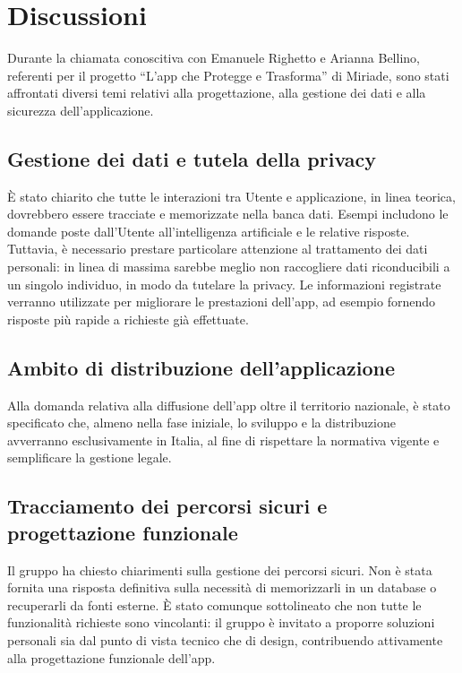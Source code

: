 \documentclass[a4paper,12pt]{article}
\begin{document}
\section{Discussioni}
Durante la chiamata conoscitiva con Emanuele Righetto e Arianna Bellino, referenti per il progetto “L’app che Protegge e Trasforma” di Miriade, sono stati affrontati diversi temi relativi alla progettazione, alla gestione dei dati e alla sicurezza dell’applicazione.

\subsection{Gestione dei dati e tutela della privacy}
È stato chiarito che tutte le interazioni tra Utente e applicazione, in linea teorica, dovrebbero essere tracciate e memorizzate nella banca dati.  
Esempi includono le domande poste dall’Utente all’intelligenza artificiale e le relative risposte. Tuttavia, è necessario prestare particolare attenzione al trattamento dei dati personali: in linea di massima sarebbe meglio non raccogliere dati riconducibili a un singolo individuo, in modo da tutelare la privacy.  
Le informazioni registrate verranno utilizzate per migliorare le prestazioni dell’app, ad esempio fornendo risposte più rapide a richieste già effettuate.

\subsection{Ambito di distribuzione dell’applicazione}
Alla domanda relativa alla diffusione dell’app oltre il territorio nazionale, è stato specificato che, almeno nella fase iniziale, lo sviluppo e la distribuzione avverranno esclusivamente in Italia, al fine di rispettare la normativa vigente e semplificare la gestione legale.

\subsection{Tracciamento dei percorsi sicuri e progettazione funzionale}
Il gruppo ha chiesto chiarimenti sulla gestione dei percorsi sicuri. Non è stata fornita una risposta definitiva sulla necessità di memorizzarli in un database o recuperarli da fonti esterne.  
È stato comunque sottolineato che non tutte le funzionalità richieste sono vincolanti: il gruppo è invitato a proporre soluzioni personali sia dal punto di vista tecnico che di design, contribuendo attivamente alla progettazione funzionale dell’app.
\end{document}
